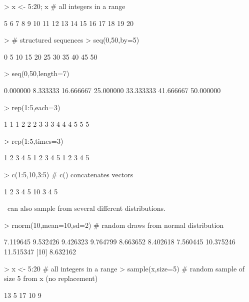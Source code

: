 \begin{Schunk}
\begin{Sinput}
> x <- 5:20; x                 # all integers in a range
\end{Sinput}
\begin{Soutput}
 [1]  5  6  7  8  9 10 11 12 13 14 15 16 17 18 19 20
\end{Soutput}
\begin{Sinput}
> # structured sequences
> seq(0,50,by=5)               
\end{Sinput}
\begin{Soutput}
 [1]  0  5 10 15 20 25 30 35 40 45 50
\end{Soutput}
\begin{Sinput}
> seq(0,50,length=7)               
\end{Sinput}
\begin{Soutput}
[1]  0.000000  8.333333 16.666667 25.000000 33.333333 41.666667 50.000000
\end{Soutput}
\begin{Sinput}
> rep(1:5,each=3)
\end{Sinput}
\begin{Soutput}
 [1] 1 1 1 2 2 2 3 3 3 4 4 4 5 5 5
\end{Soutput}
\begin{Sinput}
> rep(1:5,times=3)
\end{Sinput}
\begin{Soutput}
 [1] 1 2 3 4 5 1 2 3 4 5 1 2 3 4 5
\end{Soutput}
\begin{Sinput}
> c(1:5,10,3:5)                # c() concatenates vectors
\end{Sinput}
\begin{Soutput}
[1]  1  2  3  4  5 10  3  4  5
\end{Soutput}
\end{Schunk}

\R\ can also sample from several different distributions.

\begin{Schunk}
\begin{Sinput}
> rnorm(10,mean=10,sd=2)    # random draws from normal distribution
\end{Sinput}
\begin{Soutput}
 [1]  7.119645  9.532426  9.426323  9.764799  8.663652  8.402618  7.560445 10.375246 11.515347
[10]  8.632162
\end{Soutput}
\begin{Sinput}
> x <- 5:20                 # all integers in a range
> sample(x,size=5)          # random sample of size 5 from x (no replacement)
\end{Sinput}
\begin{Soutput}
[1] 13  5 17 10  9
\end{Soutput}
\end{Schunk}

